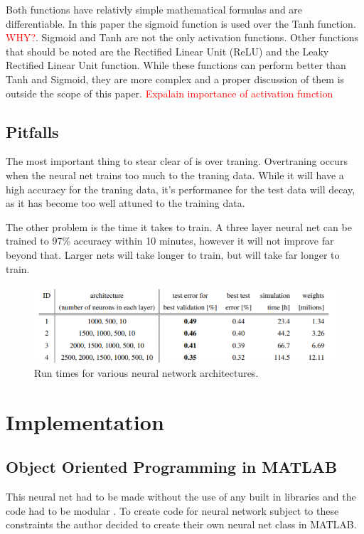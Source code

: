 \documentclass[12pt]{article}
\begin{document}
	Both functions have relativly simple mathematical formulas and are differentiable. In this paper the sigmoid function is used over the Tanh function. \textcolor{red}{WHY?}. Sigmoid and Tanh are not the only activation functions. Other functions that should be noted are the Rectified Linear Unit (ReLU) and the Leaky Rectified Linear Unit function. While these functions can perform better than Tanh and Sigmoid, they are more complex and a proper discussion of them is outside the scope of this paper. \textcolor{red}{Expalain importance of activation function}
	
	\subsection{Pitfalls}
	The most important thing to stear clear of is over traning. Overtraning occurs when the neural net trains too much to the traning data. While it will have a high accuracy for the traning data, it's performance for the test data will decay, as it has become too well attuned to the training data.  \par 
	
	The other problem is the time it takes to train. A three layer neural net can be trained to 97\% accuracy within 10 minutes, however it will not improve far beyond that. Larger nets will take longer to train, but will take far longer to train. 
	
	\begin{figure}
		\centering
		\includegraphics[width=0.7\linewidth]{nnRunTime}
		\caption{Run times for various neural network architectures\cite{deepBig}.}
		\label{fig:nnruntime}
	\end{figure}
	
	\section{Implementation}
	\subsection{Object Oriented Programming in MATLAB}
	This neural net had to be made without the use of any built in libraries \cite{Hicken18gradProjDes} and the code had to be modular \cite{Hicken18gradProjRubric}. To create code for neural network subject to these constraints the author decided to create their own neural net class in MATLAB. \par 
	
\end{document}
